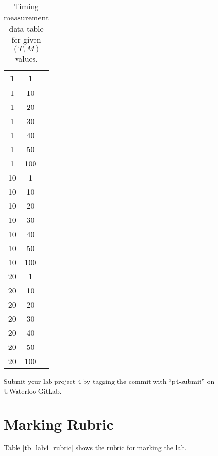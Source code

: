 \begin{enumerate}
\begin{table}[H]
\begin{center}
\begin{tabular}{|c|c|c|}
1 &    1 &    \\ \hline
1 &    10 &    \\ \hline
1 &    20 &    \\ \hline
1 &    30 &     \\ \hline
1 &    40 &     \\ \hline
1 &    50 &     \\ \hline
1 &    100 &    \\ \hline
10 &    1 &     \\ \hline
10 &    10 &    \\ \hline
10 &    20 &    \\ \hline
10 &    30 &    \\ \hline
10 &    40 &    \\ \hline
10 &    50 &    \\ \hline
10 &    100 &   \\ \hline
20 &    1 &     \\ \hline
20 &    10 &    \\ \hline
20 &    20 &    \\ \hline
20 &    30 &    \\ \hline
20 &    40 &    \\ \hline
20 &    50 &    \\ \hline
20 &    100 &    \\ \hline

\end{tabular}
\caption{Timing measurement data table for given $(T, M)$ values.}
\label{tb_timing_lab4}
\end{center}
\end{table}
\end{enumerate}

\iffalse
Use \verb+zip+ command to archive and compress the contents of lab4 directory and name it \verb+lab4.zip+. We expect the command \verb+unzip lab4.zip+ will produce a \verb+lab4+ sub-directory in the current working directory and under the \verb+lab4+ sub-directory we will find your source code, the Makefile and the lab4\_hostname.csv file.
\fi
Submit your lab project 4 by tagging the commit with ``p4-submit'' on UWaterloo GitLab.
\section{Marking Rubric}

Table \ref{tb_lab4_rubric} shows the rubric for marking the lab.

